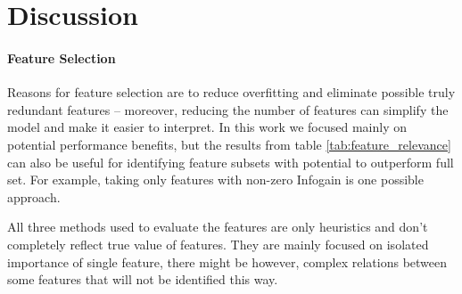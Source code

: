 \section{Discussion}

\paragraph{Feature Selection}
Reasons for feature selection are to reduce overfitting and eliminate possible truly redundant features -- moreover, reducing the number of features can simplify the model and make it easier to interpret. In this work we focused mainly on potential performance benefits, but the results from table \ref{tab:feature_relevance} can also be useful for identifying feature subsets with potential to outperform full set. For example, taking only features with non-zero Infogain is one possible approach.
%
%
%
%
%
%
%

All three methods used to evaluate the features are only heuristics and don't completely reflect true value of features. They are mainly focused on isolated importance of single feature, there might be however, complex relations between some features that will not be identified this way.

